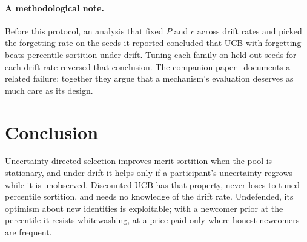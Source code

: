 \documentclass[sigconf,anonymous,review,nonacm]{acmart}
\begin{document}
\paragraph{A methodological note.} Before this protocol, an analysis that fixed $P$ and $c$
across drift rates and picked the forgetting rate on the seeds it reported concluded that UCB
with forgetting beats percentile sortition under drift. Tuning each family on held-out seeds
for each drift rate reversed that conclusion. The companion paper~\cite{companionA} documents
a related failure; together they argue that a mechanism's evaluation deserves as much care as
its design.

\section{Conclusion}
Uncertainty-directed selection improves merit sortition when the pool is stationary, and
under drift it helps only if a participant's uncertainty regrows while it is unobserved.
Discounted UCB has that property, never loses to tuned percentile sortition, and needs no
knowledge of the drift rate. Undefended, its optimism about new identities is exploitable;
with a newcomer prior at the percentile it resists whitewashing, at a price paid only where
honest newcomers are frequent.



\end{document}
